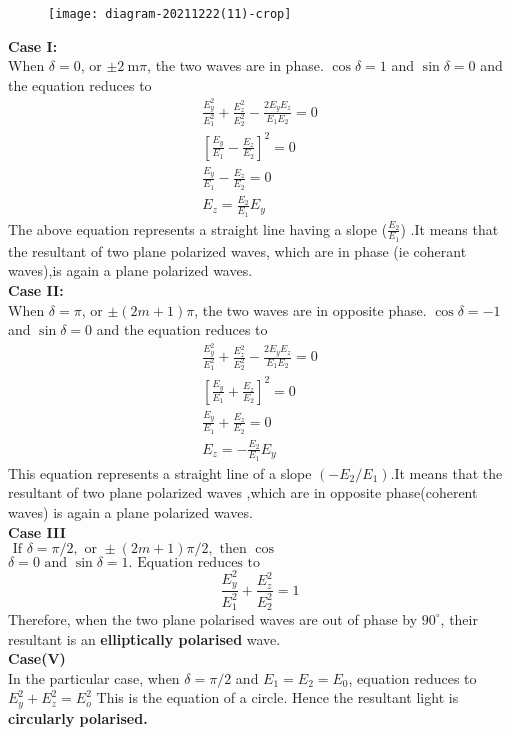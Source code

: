  
 




\begin{figure}[H]
	\centering
	\texttt{[image: diagram-20211222(11)-crop]}
	\caption{}
	\label{}
\end{figure}
\textbf{Case I:}\\
When $\delta=0$, or $\pm 2 \mathrm{~m} \pi$, the two waves are in phase.
$\cos \delta=1$ and $\sin \delta=0$ and the equation reduces to
$$
\begin{gathered}
\frac{E_{y}^{2}}{E_{1}^{2}}+\frac{E_{z}^{2}}{E_{2}^{2}}-\frac{2 E_{y} E_{z}}{E_{1} E_{2}}=0 \\
{\left[\frac{E_{y}}{E_{1}}-\frac{E_{z}}{E_{2}}\right]^{2}=0} \\
\frac{E_{y}}{E_{1}}-\frac{E_{z}}{E_{2}}=0 \\
E_{z}=\frac{E_{2}}{E_{1}} E_{y}
\end{gathered}
$$
 The above equation represents a straight line having a slope ($\frac{E_2}{E_1}$) .It means that the resultant of two plane polarized waves, which are in phase (ie coherant waves),is again a plane polarized waves.\\
 \textbf{Case II:} \\
 When $\delta=\pi$, or $\pm(2 m+1) \pi$, the two waves are in opposite phase. $\cos \delta=-1$ and $\sin \delta=0$ and the equation reduces to
 $$
 \begin{gathered}
 \frac{E_{y}^{2}}{E_{1}^{2}}+\frac{E_{z}^{2}}{E_{2}^{2}}-\frac{2 E_{y} E_{z}}{E_{1} E_{2}}=0 \\
 {\left[\frac{E_{y}}{E_{1}}+\frac{E_{z}}{E_{2}}\right]^{2}=0} \\
 \frac{E_{y}}{E_{1}}+\frac{E_{z}}{E_{2}}=0 \\
 E_{z}=-\frac{E_{2}}{E_{1}} E_{y}
 \end{gathered}
 $$
 This equation represents a straight line of a slope $\left(-E_{2} / E_{1}\right)$.It means that the resultant of two plane polarized waves ,which are in opposite phase(coherent waves) is again a plane polarized waves.\\
 \textbf{Case III}\\
 $\text { If } \delta=\pi / 2, \text { or } \pm(2 m+1) \pi / 2, \text { then } \cos $$\delta=0 \text { and } \sin \delta=1 . \text { Equation} \text { reduces to }$
 $$\frac{E_{y}^{2}}{E_{1}^{2}}+\frac{E_{z}^{2}}{E_{2}^{2}}=1$$
  Therefore, when the two plane polarised waves are out of phase by $90^{\circ}$, their resultant is an \textbf{elliptically polarised} wave.\\
  \textbf{Case(V)}\\
   In the particular case, when $\delta=\pi / 2$ and $E_{1}=E_{2}=E_{0}$, equation reduces to $E_{y}^{2}+E_{z}^{2}=E_{o}^{2}$
  This is the equation of a circle. Hence the resultant light is \textbf{circularly polarised.
  }\\
 
